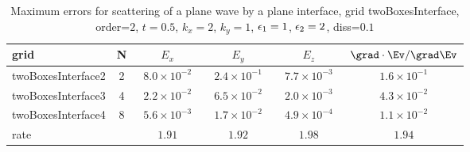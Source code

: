 \begin{table}[hbt]
\begin{center}
\begin{tabular}{|l|c|c|c|c|c|} \hline
grid  & N &  $E_x$ &  $E_y$ & $E_z$ & $\grad\cdot\Ev/\grad\Ev$\\ \hline 
  twoBoxesInterface2 &     2 & ~$8.0\times10^{ -2}$~ & ~$2.4\times10^{ -1}$~ & ~$7.7\times10^{ -3}$~ & ~$1.6\times10^{ -1}$~  \\ \hline
  twoBoxesInterface3 &     4 & ~$2.2\times10^{ -2}$~ & ~$6.5\times10^{ -2}$~ & ~$2.0\times10^{ -3}$~ & ~$4.3\times10^{ -2}$~  \\ \hline
  twoBoxesInterface4 &     8 & ~$5.6\times10^{ -3}$~ & ~$1.7\times10^{ -2}$~ & ~$4.9\times10^{ -4}$~ & ~$1.1\times10^{ -2}$~  \\ \hline
    rate             &       &       $1.91$          &       $1.92$          &       $1.98$          &       $1.94$           \\ \hline
\end{tabular}
\caption{Maximum errors for scattering of a plane wave by a plane interface, grid twoBoxesInterface, order=$2$, $t=0.5$, $k_x=2$, $k_y=1$, $\epsilon_1=1$, $\epsilon_2=2$, diss=$0.1$}\label{table:planeInterface3d}
\end{center}
\end{table}
